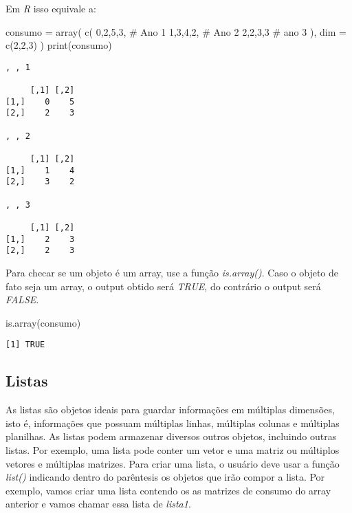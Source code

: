 \documentclass[
  letterpaper,
  DIV=11,
  numbers=noendperiod]{scrreprt}
\newenvironment{Shaded}{\begin{snugshade}}{\end{snugshade}}
\newcommand{\AttributeTok}[1]{\textcolor[rgb]{0.40,0.45,0.13}{#1}}
\newcommand{\CommentTok}[1]{\textcolor[rgb]{0.37,0.37,0.37}{#1}}
\newcommand{\DecValTok}[1]{\textcolor[rgb]{0.68,0.00,0.00}{#1}}
\newcommand{\FunctionTok}[1]{\textcolor[rgb]{0.28,0.35,0.67}{#1}}
\newcommand{\NormalTok}[1]{\textcolor[rgb]{0.00,0.23,0.31}{#1}}
\newcommand{\OtherTok}[1]{\textcolor[rgb]{0.00,0.23,0.31}{#1}}
\begin{document}
Em \emph{R} isso equivale a:

\begin{Shaded}
\begin{Highlighting}[]
\NormalTok{consumo }\OtherTok{=} \FunctionTok{array}\NormalTok{(}
  \FunctionTok{c}\NormalTok{(}
    \DecValTok{0}\NormalTok{,}\DecValTok{2}\NormalTok{,}\DecValTok{5}\NormalTok{,}\DecValTok{3}\NormalTok{, }\CommentTok{\# Ano 1}
    \DecValTok{1}\NormalTok{,}\DecValTok{3}\NormalTok{,}\DecValTok{4}\NormalTok{,}\DecValTok{2}\NormalTok{, }\CommentTok{\# Ano 2}
    \DecValTok{2}\NormalTok{,}\DecValTok{2}\NormalTok{,}\DecValTok{3}\NormalTok{,}\DecValTok{3} \CommentTok{\# ano 3}
\NormalTok{  ),}
  \AttributeTok{dim =} \FunctionTok{c}\NormalTok{(}\DecValTok{2}\NormalTok{,}\DecValTok{2}\NormalTok{,}\DecValTok{3}\NormalTok{)}
\NormalTok{)}
\FunctionTok{print}\NormalTok{(consumo)}
\end{Highlighting}
\end{Shaded}

\begin{verbatim}
, , 1

     [,1] [,2]
[1,]    0    5
[2,]    2    3

, , 2

     [,1] [,2]
[1,]    1    4
[2,]    3    2

, , 3

     [,1] [,2]
[1,]    2    3
[2,]    2    3
\end{verbatim}

Para checar se um objeto é um array, use a função \emph{is.array()}.
Caso o objeto de fato seja um array, o output obtido será \emph{TRUE},
do contrário o output será \emph{FALSE}.

\begin{Shaded}
\begin{Highlighting}[]
\FunctionTok{is.array}\NormalTok{(consumo)}
\end{Highlighting}
\end{Shaded}

\begin{verbatim}
[1] TRUE
\end{verbatim}

\subsection{Listas}\label{listas}

As listas são objetos ideais para guardar informações em múltiplas
dimensões, isto é, informações que possuam múltiplas linhas, múltiplas
colunas e múltiplas planilhas. As listas podem armazenar diversos outros
objetos, incluindo outras listas. Por exemplo, uma lista pode conter um
vetor e uma matriz ou múltiplos vetores e múltiplas matrizes. Para criar
uma lista, o usuário deve usar a função \emph{list()} indicando dentro
do parêntesis os objetos que irão compor a lista. Por exemplo, vamos
criar uma lista contendo os as matrizes de consumo do array anterior e
vamos chamar essa lista de \emph{lista1}.
\end{document}
